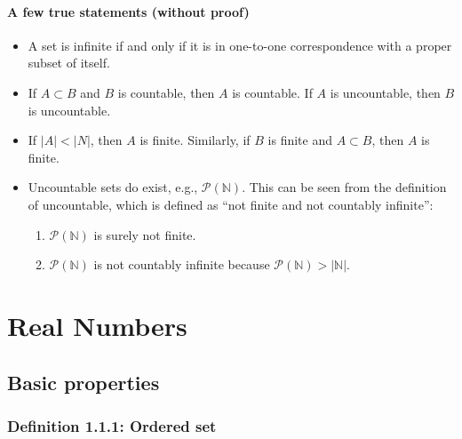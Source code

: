 \documentclass[12pt, letterpaper, oneside]{book}
\begin{document}
\subsubsection{A few true statements (without proof)}

\begin{itemize}
  \item A set is infinite if and only if it is in one-to-one correspondence
        with a proper subset of itself.
  \item If $A \subset B$ and $B$ is countable, then $A$ is countable. If $A$ is
        uncountable, then $B$ is uncountable.
  \item If $|A| < |N|$, then $A$ is finite. Similarly, if $B$ is finite and $A
          \subset B$, then $A$ is finite.
  \item Uncountable sets do exist, e.g., $\mathcal{P}(\mathbb{N})$. This can be
        seen from the definition of uncountable, which is defined as ``not finite
        and not countably infinite'':
        \begin{enumerate}
          \item $\mathcal{P}(\mathbb{N})$ is surely not finite.
          \item $\mathcal{P}(\mathbb{N})$ is not countably infinite because
                $\mathcal{P}(\mathbb{N}) > |\mathbb{N}|$.
        \end{enumerate}
\end{itemize}

%
%

\chapter{Real Numbers}

\section{Basic properties}

\subsection{Definition 1.1.1: Ordered set}
\end{document}
